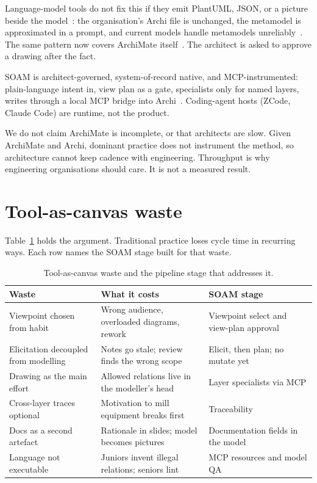 \documentclass[10pt,journal,compsoc]{IEEEtran}
\begin{document}
Language-model tools do not fix this if they emit PlantUML, JSON, or a picture beside the model~\cite{camara2023,fill2023}: the organisation's Archi file is unchanged, the metamodel is approximated in a prompt, and current models handle metamodels unreliably~\cite{muff2024}. The same pattern now covers ArchiMate itself~\cite{nast2026}. The architect is asked to approve a drawing after the fact.

SOAM is architect-governed, system-of-record native, and MCP-instrumented: plain-language intent in, view plan as a gate, specialists only for named layers, writes through a local MCP bridge into Archi~\cite{mcp2025,jgsarchiskills,jgsarchibridge}. Coding-agent hosts (ZCode, Claude Code) are runtime, not the product.

We do not claim ArchiMate is incomplete, or that architects are slow. Given ArchiMate and Archi, dominant practice does not instrument the method, so architecture cannot keep cadence with engineering. Throughput is why engineering organisations should care. It is not a measured result.

\section{Tool-as-canvas waste}

Table~\ref{tab:waste} holds the argument. Traditional practice loses cycle time in recurring ways. Each row names the SOAM stage built for that waste.

\begin{table}[!t]
\caption{Tool-as-canvas waste and the pipeline stage that addresses it.}
\label{tab:waste}
\centering
{\scriptsize
\begin{tabularx}{\columnwidth}{@{}>{\raggedright\arraybackslash}p{} >{\raggedright\arraybackslash}X >{\raggedright\arraybackslash}p{}@{}}
\toprule
\textbf{Waste} & \textbf{What it costs} & \textbf{SOAM stage} \\
\midrule
Viewpoint chosen from habit & Wrong audience, overloaded diagrams, rework & Viewpoint select and view-plan approval \\
Elicitation decoupled from modelling & Notes go stale; review finds the wrong scope & Elicit, then plan; no mutate yet \\
Drawing as the main effort & Allowed relations live in the modeller's head & Layer specialists via MCP \\
Cross-layer traces optional & Motivation to mill equipment breaks first & Traceability \\
Docs as a second artefact & Rationale in slides; model becomes pictures & Documentation fields in the model \\
Language not executable & Juniors invent illegal relations; seniors lint & MCP resources and model QA \\
\bottomrule
\end{tabularx}}
\end{table}
\end{document}
